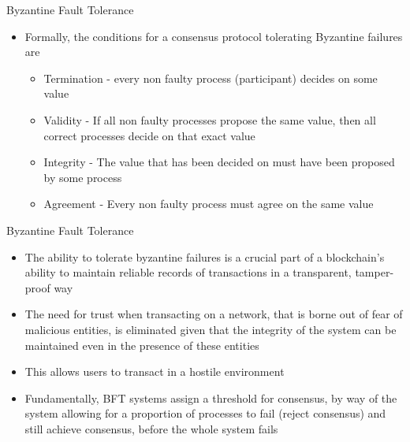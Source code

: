 \documentclass[9pt]{beamer}
\begin{document}

\begin{frame}{Byzantine Fault Tolerance}
	\begin{itemize}
		\item Formally, the conditions for a consensus protocol tolerating Byzantine failures are
		\begin{itemize}
			\item Termination - every non faulty process (participant) decides on some value
			\item Validity - If all non faulty processes propose the same value, then all correct processes decide on that exact value
			\item Integrity - The value that has been decided on must have been proposed by some process
			\item Agreement - Every non faulty process must agree on the same value
		\end{itemize}
	\end{itemize}
\end{frame}


\begin{frame}{Byzantine Fault Tolerance}
	\begin{itemize}
		\item The ability to tolerate byzantine failures is a crucial part of a blockchain's ability to maintain reliable records of transactions in a transparent, tamper-proof way
		\item The need for trust when transacting on a network, that is borne out of fear of malicious entities, is eliminated given that the integrity of the system can be maintained even in the presence of these entities
		\item This allows users to transact in a hostile environment
		\item Fundamentally, BFT systems assign a threshold for consensus, by way of the system allowing for a proportion of processes to fail (reject consensus) and still achieve consensus, before the whole system fails
	\end{itemize}
\end{frame}

\end{document}
